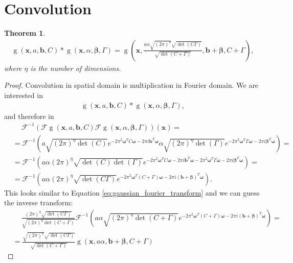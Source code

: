 \documentclass{paper}
\newtheorem{theorem}{Theorem}
\newcommand{\F}{\ensuremath{\mathcal{F}}}
\newcommand{\vr}[1]{\ensuremath{\boldsymbol{#1}}}
\newcommand{\f}[1]{\operatorname{#1}}
\newcommand{\betavec}[0]{\ensuremath{\vr{\beta{}}}}
\newcommand{\omegavec}[0]{\ensuremath{\vr{\omega{}}}}
\newcommand{\bvec}[0]{\ensuremath{\vr{b}}}
\newcommand{\xvec}[0]{\ensuremath{\vr{x}}}
\begin{document}
\section{Convolution}
\label{sec:convolution}
\begin{theorem}
	\begin{align}
		\f{g}(\xvec, a, \bvec, C) \ast \f{g}(\xvec, \alpha, \vr{\beta}, \Gamma) = 
		\f{g}\left(\xvec, \frac{a \alpha \sqrt{(2 \pi)^\eta} \sqrt{\f{det}(C\Gamma)}}{\sqrt{\f{det}(C+\Gamma)}}, \bvec + \betavec, C + \Gamma\right),
	\end{align}
	where $\eta$ is the number of dimensions.
\end{theorem}
\begin{proof}
Convolution in spatial domain is multiplication in Fourier domain.
We are interested in
\begin{align*}
	\f{g}(\xvec, a, \bvec, C) \ast \f{g}(\xvec, \alpha, \vr{\beta}, \Gamma),
\end{align*}
and therefore in
\begin{align*}
	&\ \quad \F^{-1}(\F\f{g}(\xvec, a, \bvec, C) \F\f{g}(\xvec, \alpha, \vr{\beta}, \Gamma))(\xvec) = \nonumber \\
	&= \F^{-1}\left(a \sqrt{(2 \pi)^\eta \f{det}(C)}      e^{-2 \pi^2 \omegavec^T C \omegavec      - 2\pi i \bvec^T \omegavec}
	         \alpha \sqrt{(2 \pi)^\eta \f{det}(\Gamma)} e^{-2 \pi^2 \omegavec^T \Gamma \omegavec - 2\pi i \betavec^T \omegavec}\right) = \nonumber \\
	&= \F^{-1}\left(a \alpha (2 \pi)^\eta \sqrt{\f{det}(C) \f{det}(\Gamma)}
			        e^{-2 \pi^2 \omegavec^T C \omegavec - 2\pi i \bvec^T \omegavec - 2 \pi^2 \omegavec^T \Gamma \omegavec - 2\pi i \betavec^T \omegavec}\right) = \nonumber \\
	\label{eq:gaussian_convolution_before_inverse_transform}
	&= \F^{-1}\left(a \alpha (2 \pi)^\eta \sqrt{\f{det}(C\Gamma)}
                    e^{-2 \pi^2 \omegavec^T (C + \Gamma) \omegavec - 2\pi i (\bvec + \betavec)^T \omegavec}\right).
\end{align*}
This looks similar to Equation \ref{eq:gaussian_fourier_transform} and we can guess the inverse transform:
\begin{align*}
	&\ \quad \frac{(2 \pi)^\eta \sqrt{\f{det}(C\Gamma)}}{\sqrt{(2\pi)^\eta \f{det}(C+\Gamma)}}
	        \F^{-1}\left(
	                     a \alpha \sqrt{(2\pi)^\eta \f{det}(C+\Gamma)}
	                     e^{-2 \pi^2 \omegavec^T (C + \Gamma) \omegavec - 2\pi i (\bvec + \betavec)^T \omegavec}\right) = \\
	&= \frac{\sqrt{(2 \pi)^\eta} \sqrt{\f{det}(C\Gamma)}}{\sqrt{\f{det}(C+\Gamma)}}
	   \f{g}(\xvec, a \alpha, \bvec + \betavec, C + \Gamma)
\end{align*}
\end{proof}
\end{document}
